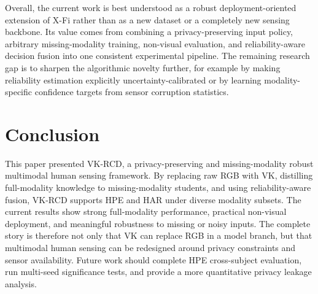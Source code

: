 \documentclass[journal, twocolumn, transmag]{IEEEtran}
\newcommand{\method}{VK-RCD}
\newcommand{\xfi}{X-Fi}
\begin{document}
Overall, the current work is best understood as a robust deployment-oriented extension of \xfi{} rather than as a new dataset or a completely new sensing backbone. Its value comes from combining a privacy-preserving input policy, arbitrary missing-modality training, non-visual evaluation, and reliability-aware decision fusion into one consistent experimental pipeline. The remaining research gap is to sharpen the algorithmic novelty further, for example by making reliability estimation explicitly uncertainty-calibrated or by learning modality-specific confidence targets from sensor corruption statistics.

\section{Conclusion}
This paper presented \method{}, a privacy-preserving and missing-modality robust multimodal human sensing framework. By replacing raw RGB with VK, distilling full-modality knowledge to missing-modality students, and using reliability-aware fusion, \method{} supports HPE and HAR under diverse modality subsets. The current results show strong full-modality performance, practical non-visual deployment, and meaningful robustness to missing or noisy inputs. The complete story is therefore not only that VK can replace RGB in a model branch, but that multimodal human sensing can be redesigned around privacy constraints and sensor availability. Future work should complete HPE cross-subject evaluation, run multi-seed significance tests, and provide a more quantitative privacy leakage analysis.
\end{document}
